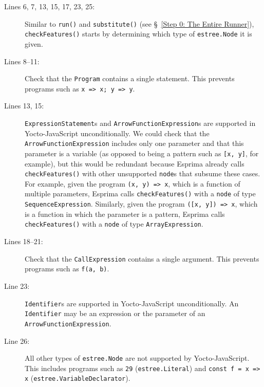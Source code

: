 \documentclass[12pt, oneside]{book}
\begin{document}
\begin{description}
\item [Lines 6, 7, 13, 15, 17, 23, 25:]

Similar to \texttt{run()} and \texttt{substitute()} (see §~\ref{Step 0: The Entire Runner}), \texttt{checkFeatures()} starts by determining which type of \texttt{estree.Node} it is given.

\item [Lines 8–11:]

Check that the \texttt{Program} contains a single statement. This prevents programs such as \texttt{x => x; y => y}.

\item [Lines 13, 15:]

\texttt{ExpressionStatement}s and \texttt{ArrowFunctionExpression}s are supported in Yocto-JavaScript unconditionally. We could check that the \texttt{ArrowFunctionExpression} includes only one parameter and that this parameter is a variable (as opposed to being a pattern such as \texttt{[x, y]}, for example), but this would be redundant because Esprima already calls \texttt{checkFeatures()} with other unsupported \texttt{node}s that subsume these cases. For example, given the program \texttt{(x, y) => x}, which is a function of multiple parameters, Esprima calls \texttt{checkFeatures()} with a \texttt{node} of type \texttt{SequenceExpression}. Similarly, given the program \texttt{([x, y]) => x}, which is a function in which the parameter is a pattern, Esprima calls \texttt{checkFeatures()} with a \texttt{node} of type \texttt{ArrayExpression}.

\item [Lines 18–21:]

Check that the \texttt{CallExpression} contains a single argument. This prevents programs such as \texttt{f(a, b)}.

\item [Line 23:]

\texttt{Identifier}s are supported in Yocto-JavaScript unconditionally. An \texttt{Identifier} may be an expression or the parameter of an \texttt{ArrowFunctionExpression}.

\item [Line 26:]

All other types of \texttt{estree.Node} are not supported by Yocto-JavaScript. This includes programs such as \texttt{29} (\texttt{estree.Literal}) and \texttt{const f = x => x} (\texttt{estree.VariableDeclarator}).
\end{description}
\end{document}
